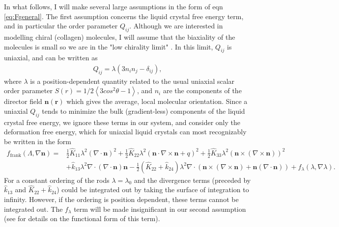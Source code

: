 \documentclass[12pt]{article}
\begin{document}
In what follows, I will make several large assumptions in the form of eqn \ref{eq:Fgeneral}. The first assumption concerns the liquid crystal free energy term, and in particular the order parameter $Q_{ij}$. Although we are interested in modelling chiral (collagen) molecules, I will assume that the biaxiality of the molecules is small so we are in the "low chirality limit" \cite{Wright:1989zz}. In this limit, $Q_{ij}$ is uniaxial, and can be written as
\begin{align}\label{eq:simpleQ}
Q_{ij}=\lambda(3n_in_j-\delta_{ij}),
\end{align}
where $\lambda$ is a position-dependent quantity related to the usual uniaxial scalar order parameter $S(r)=1/2\left<3cos^2\theta-1\right>$, and $n_i$ are the components of the director field $\bm{n}(\bm{r})$ which gives the average, local molecular orientation. Since a uniaxial $Q_{ij}$ tends to minimize the bulk (gradient-less) components of the liquid crystal free energy, we ignore these terms in our system, and consider only the deformation free energy, which for uniaxial liquid crystals can most recognizably be written in the form
\begin{align}
f_{\mathrm{frank}}(\Lambda,\nabla\bm{n})=&\frac{1}{2}\hat{K}_{11}\lambda^2(\nabla\cdot\bm{n})^2+\frac{1}{2}\hat{K}_{22}\lambda^2(\bm{n}\cdot\nabla\times\bm{n}+q)^2+\frac{1}{2}\hat{K}_{33}\lambda^2(\bm{n}\times(\nabla\times\bm{n}))^2\nonumber\\
&+\hat{k}_{13}\lambda^2\nabla\cdot(\nabla\cdot\bm{n})\bm{n}-\frac{1}{2}(\hat{K}_{22}+\hat{k}_{24})\lambda^2\nabla\cdot(\bm{n}\times(\nabla\times\bm{n})+\bm{n}(\nabla\cdot\bm{n}))+f_{\lambda}(\lambda,\nabla\lambda).
\end{align}
For a constant ordering of the rods $\lambda = \lambda_0$ and the divergence terms (preceded by $\hat{k}_{13}$ and $\hat{K}_{22}+\hat{k}_{24}$) could be integrated out by taking the surface of integration to infinity. However, if the ordering is position dependent, these terms cannot be integrated out. The $f_{\lambda}$ term will be made insignificant in our second assumption (see \cite{Wright:1989zz} for details on the functional form of this term).
\end{document}
